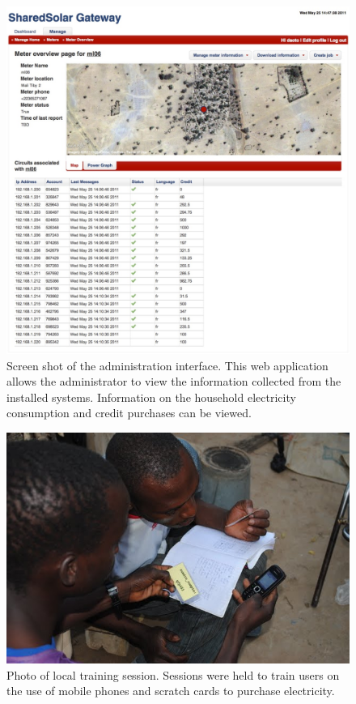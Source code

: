 \documentclass{sig-alternate}
\begin{document}
\begin{figure}[]
\begin{center}
\includegraphics[width=\columnwidth]{figures/gateway.jpg}
\end{center}
\caption{Screen shot of the administration interface.  This web application allows
the administrator to view the information collected from the installed systems.  Information
on the household electricity consumption and credit purchases can be viewed.  }
\label{gateway}
\end{figure}

\begin{figure}[]
\begin{center}
\includegraphics[width=\columnwidth]{figures/training.jpg}
\end{center}
\caption{Photo of local training session.  Sessions were held to train users on the use
of mobile phones and scratch cards to purchase electricity.}
\label{training}
\end{figure}
\end{document}
